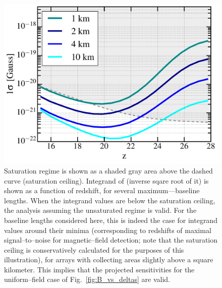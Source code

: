 \begin{figure}
\centering
\includegraphics[width=.4\textwidth,keepaspectratio=true]{sigmaB0_vs_z.pdf}
\caption{Saturation regime is shown as a shaded gray area above the dashed curve (saturation ceiling). Integrand of \eq{\ref{eq:fisher_patch}} (inverse sqare root of it) is shown as a function of redshift, for several maximum---baseline lengths.  When the integrand values are below the saturation ceiling, the analysis assuming the unsaturated regime is valid. For the baseline lengths considered here, this is indeed the case for integrand values around their minima (corresponding to redshifts of maximal signal--to--noise for magnetic--field detection; note that the saturation ceiling is conservatively calculated for the purposes of this illustration), for arrays with collecting areas slightly above a square kilometer. This implies that the projected sensitivities for the uniform--field case of Fig.~\ref{fig:B_vs_deltas} are valid. \label{fig:Bsat}}
\end{figure}
